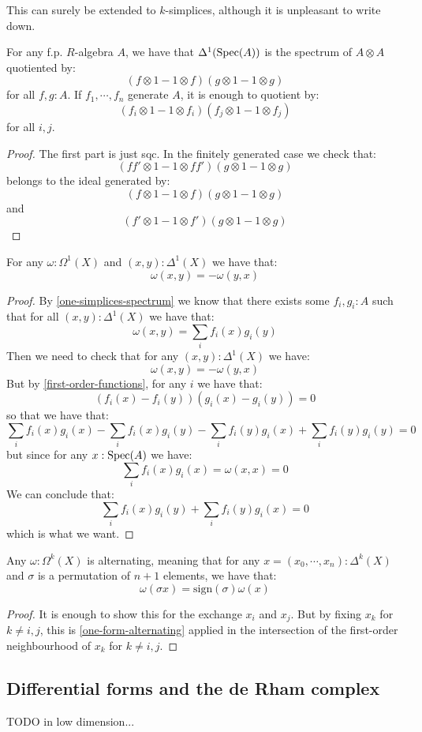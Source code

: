 This can surely be extended to $k$-simplices, although it is unpleasant to write down.

\begin{corollary}\label{one-simplices-spectrum}
For any f.p. $R$-algebra $A$, we have that $\Delta^1(\operatorname{Spec}(A))$ is the spectrum of $A\otimes A$ quotiented by:
\[(f\otimes 1 - 1\otimes f)(g\otimes 1 - 1\otimes g)\]
for all $f,g:A$. If $f_1,\cdots,f_n$ generate $A$, it is enough to quotient by:
\[(f_i\otimes 1 - 1\otimes f_i)(f_j\otimes 1 - 1\otimes f_j)\]
for all $i,j$.
\end{corollary}

\begin{proof}
The first part is just sqc. In the finitely generated case we check that:
\[(ff'\otimes 1 - 1\otimes ff')(g\otimes 1 - 1\otimes g)\]
belongs to the ideal generated by:
\[(f\otimes 1 - 1\otimes f)(g\otimes 1 - 1\otimes g)\]
and
\[(f'\otimes 1 - 1\otimes f')(g\otimes 1 - 1\otimes g)\]
\end{proof}

\begin{lemma}\label{one-form-alternating}
For any $\omega:\Omega^1(X)$ and $(x,y):\Delta^1(X)$ we have that:
\[\omega(x,y) = - \omega(y,x)\]
\end{lemma}

\begin{proof}
By \cref{one-simplices-spectrum} we know that there exists some $f_i,g_i:A$ such that for all $(x,y):\Delta^1(X)$ we have that:
\[\omega(x,y) = \sum_i f_i(x)g_i(y)\]
Then we need to check that for any $(x,y):\Delta^1(X)$ we have:
\[\omega(x,y) = - \omega(y,x)\]
But by \cref{first-order-functions}, for any $i$ we have that:
\[(f_i(x)-f_i(y))(g_i(x)-g_i(y)) = 0\]
so that we have that:
\[ \sum_i f_i(x)g_i(x)  -\sum_i f_i(x)g_i(y) - \sum_i f_i(y)g_i(x) + \sum_i f_i(y)g_i(y) = 0 \]
but since for any $x:\operatorname{Spec}(A)$ we have:
\[\sum_i f_i(x)g_i(x) = \omega(x,x) = 0\]
We can conclude that:
\[ \sum_i f_i(x)g_i(y) + \sum_i f_i(y)g_i(x) = 0\]
which is what we want.
\end{proof}

\begin{proposition}\label{differential-form-alternating}
Any $\omega:\Omega^k(X)$ is alternating, meaning that for any $x = (x_0,\cdots,x_n):\Delta^k(X)$ and $\sigma$ is a permutation of $n+1$ elements, we have that:
\[\omega(\sigma x) = \mathrm{sign}(\sigma)\omega(x) \]
\end{proposition}

\begin{proof}
It is enough to show this for the exchange $x_i$ and $x_j$. But by fixing $x_k$ for $k\not=i,j$, this is \cref{one-form-alternating} applied in the intersection of the first-order neighbourhood of $x_k$ for $k\not=i,j$.
\end{proof}

\subsection{Differential forms and the de Rham complex}

TODO in low dimension...

